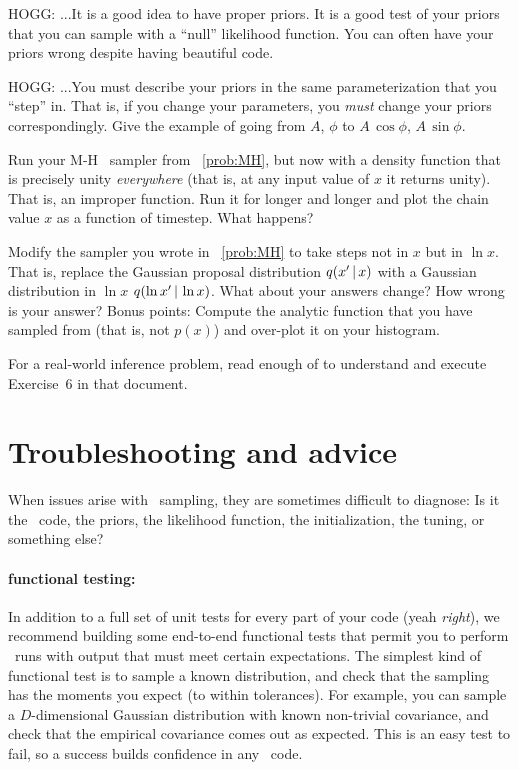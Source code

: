 \documentclass[12pt,twoside,pdftex]{article}
\newcommand{\MCMC}{\acronym{MCMC}}
\begin{document}
HOGG: ...It is a good idea to have proper priors.
It is a good test of your priors that you can sample with a ``null'' likelihood function.
You can often have your priors wrong despite having beautiful code.

HOGG: ...You must describe your priors in the same parameterization that you ``step'' in.
That is, if you change your parameters, you \emph{must} change your priors correspondingly.
Give the example of going from $A$, $\phi$ to $A\,\cos\phi$, $A\,\sin\phi$.

\begin{problem}
Run your M-H \MCMC\ sampler from \problemname~\ref{prob:MH}, but now
with a density function that is precisely unity \emph{everywhere}
(that is, at any input value of $x$ it returns unity).  That is, an
improper function.  Run it for longer and longer and plot the chain
value $x$ as a function of timestep.  What happens?
\end{problem}

\begin{problem}
Modify the sampler you wrote in \problemname~\ref{prob:MH} to take
steps not in $x$ but in $\ln x$.  That is, replace the Gaussian
proposal distribution $q(x'\,|\, x)$ with a Gaussian distribution in
$\ln x$ $q(\ln x'\,|\, \ln x)$.  What about your answers change?  How
wrong is your answer?  Bonus points: Compute the analytic function
that you have sampled from (that is, not $p(x)$) and over-plot it on
your histogram.
\end{problem}

\begin{problem}
For a real-world inference problem, read enough of
\citet{fittingaline} to understand and execute Exercise~6 in that
document.
\end{problem}

\section{Troubleshooting and advice}\label{sec:trouble}

When issues arise with \MCMC\ sampling,
  they are sometimes difficult to diagnose:
Is it the \MCMC\ code, the priors, the likelihood function,
  the initialization, the tuning, or something else?

\paragraph{functional testing:}
In addition to a full set of unit tests for every part of your code
  (yeah \emph{right}),
  we recommend building some end-to-end functional tests that permit you to perform \MCMC\ 
  runs with output that must meet certain expectations.
The simplest kind of functional test is to sample a known distribution,
  and check that the sampling has the moments you expect (to within tolerances).
For example, you can sample a $D$-dimensional Gaussian distribution with known non-trivial covariance,
  and check that the empirical covariance comes out as expected.
This is an easy test to fail, so a success builds confidence in any \MCMC\ code.
\end{document}
